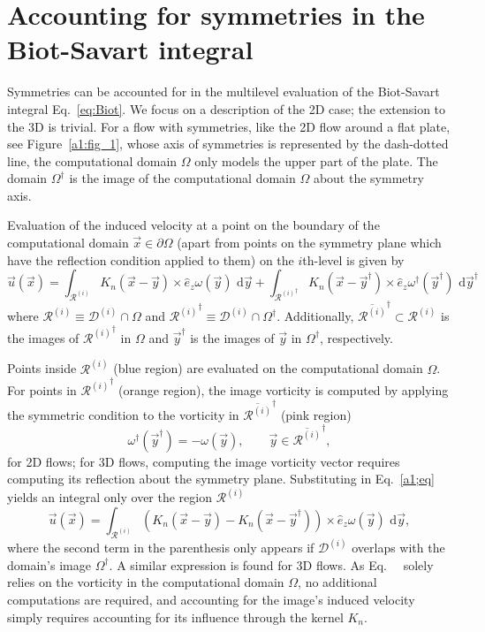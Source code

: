 \documentclass[11pt]{article}
\begin{document}
\section{Accounting for symmetries in the Biot-Savart integral}
\label{A1}

Symmetries can be accounted for in the multilevel evaluation of the Biot-Savart integral Eq.~\ref{eq:Biot}. We focus on a description of the 2D case; the extension to the 3D is trivial. For a flow with symmetries, like the 2D flow around a flat plate, see Figure~\ref{a1:fig_1}, whose axis of symmetries is represented by the dash-dotted line, the computational domain $\Omega$ only models the upper part of the plate. The domain $\Omega^\dagger$ is the image of the computational domain $\Omega$ about the symmetry axis.

Evaluation of the induced velocity at a point on the boundary of the computational domain $\vec{x}\in\partial\Omega$ (apart from points on the symmetry plane which have the reflection condition applied to them) on the $i$th-level is given by
\begin{equation}\label{a1;eq}
     {\vec u}({\vec x}) = \int_{\mathcal{R}^{(i)}} K_{n}({\vec x} - \vec{y})\times \hat{e}_z\omega({\vec y})\text{ d}\vec{y} + \int_{{\mathcal{R}^{(i)}}^\dagger} K_{n}({\vec x} - \vec{y}^\dagger)\times \hat{e}_z\omega^\dagger({\vec y}^\dagger)\text{ d}\vec{y}^\dagger
\end{equation}
where $\mathcal{R}^{(i)}\equiv\mathcal{D}^{(i)}\cap\Omega$ and ${\mathcal{R}^{(i)}}^\dagger\equiv\mathcal{D}^{(i)}\cap\Omega^\dagger$. Additionally, $\overline{\mathcal{R}^{(i)}}^\dagger\subset\mathcal{R}^{(i)}$ is the images of ${\mathcal{R}^{(i)}}^\dagger$ in $\Omega$ and ${\vec{y}}^\dagger$ is the images of $\vec{y}$ in $\Omega^\dagger$, respectively.

Points inside ${\mathcal{R}^{(i)}}$ (blue region) are evaluated on the computational domain $\Omega$. For points in ${\mathcal{R}^{(i)}}^\dagger$ (orange region), the image vorticity is computed by applying the symmetric condition to the vorticity in $\overline{\mathcal{R}^{(i)}}^\dagger$ (pink region)
\begin{equation}
    \omega^\dagger(\vec{y}^\dagger) = -\omega(\vec{y}), \quad\quad \vec{y}\in\overline{\mathcal{R}^{(i)}}^\dagger,
\end{equation}
for 2D flows; for 3D flows, computing the image vorticity vector requires computing its reflection about the symmetry plane. Substituting in Eq.~\ref{a1;eq} yields an integral only over the region $\mathcal{R}^{(i)}$
\begin{equation}
     {\vec u}({\vec x}) = \int_{\mathcal{R}^{(i)}} \left(K_{n}({\vec x} - \vec{y})-K_{n}({\vec x} - \vec{y}^\dagger)\right)\times \hat{e}_z\omega({\vec y})\text{ d}\vec{y},
\end{equation}
where the second term in the parenthesis only appears if $\mathcal{D}^{(i)}$ overlaps with the domain's image $\Omega^\dagger$. A similar expression is found for 3D flows. As Eq.~\theequation~ solely relies on the vorticity in the computational domain $\Omega$, no additional computations are required, and accounting for the image's induced velocity simply requires accounting for its influence through the kernel $K_n$.
\end{document}
